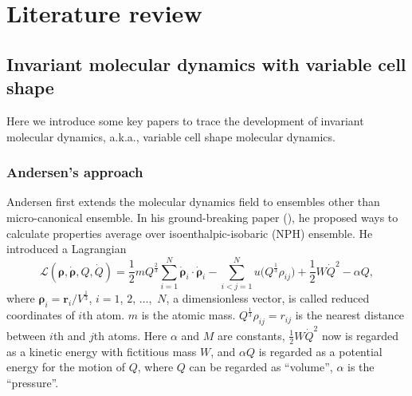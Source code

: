
\section{Literature review}

\subsection{Invariant molecular dynamics with variable cell shape}

Here we introduce some key papers to trace the development of invariant molecular dynamics,
a.k.a., variable cell shape molecular dynamics.

\subsubsection{Andersen's approach}

Andersen first extends the molecular dynamics field to
ensembles other than micro-canonical ensemble.
In his ground-breaking paper (\cite{Andersen:1980ew}),
he proposed ways to calculate properties average
over isoenthalpic-isobaric (NPH) ensemble. He introduced
a Lagrangian
\begin{equation}\label{eq:andersenlagrang}
	\mathcal{L}(\bm{\rho}, \dot{\bm{\rho}}, Q, \dot{ Q }) = \frac{ 1 }{ 2 } m
	Q^{\frac{ 2 }{ 3 }}
	\sum_{i=1}^{N} \dot{ \bm{\rho} }_i \cdot \dot{ \bm{\rho} }_i - \sum_{i<j=1}^{N}
	u \big(Q^{\frac{ 1 }{ 3 }} \rho_{ij} \big) + \frac{ 1 }{ 2 } W \dot{ Q } ^2 -
	\alpha Q,
\end{equation}
where $\bm{\rho}_i = \bm{r}_i / V ^{\frac{ 1 }{ 3 }}$, $i=1$, $2$, $\ldots$,~$N$,
a dimensionless vector,
is called reduced coordinates of $i$th atom. $m$ is the atomic mass.
$Q^{\frac{ 1 }{ 3 }}\rho_{ij} = r_{ij}$ is the nearest distance between
$i$th and $j$th atoms.
Here $\alpha$ and $M$ are constants,
$\frac{ 1 }{ 2 } W \dot{ Q }^2$ now is regarded as a kinetic energy with fictitious
mass $W$,
and $\alpha Q$ is regarded as a potential energy for the motion of $Q$,
where $Q$ can be regarded as ``volume'', $\alpha$ is the ``pressure''.

